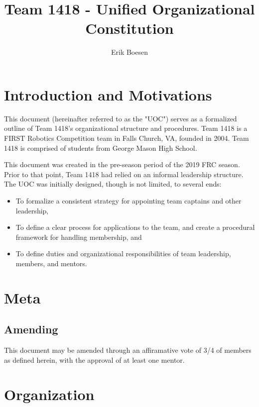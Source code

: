 \documentclass{proc}
\begin{document}
\title{Team 1418 - Unified Organizational Constitution}
\author{Erik Boesen}

\maketitle

\section{Introduction and Motivations}
This document (hereinafter referred to as the "UOC") serves as a formalized outline of Team 1418's organizational structure and procedures. Team 1418 is a FIRST Robotics Competition team in Falls Church, VA, founded in 2004. Team 1418 is comprised of students from George Mason High School.

This document was created in the pre-season period of the 2019 FRC season. Prior to that point, Team 1418 had relied on an informal leadership structure. The UOC was initially designed, though is not limited, to several ends:
\begin{itemize}
  \item{To formalize a consistent strategy for appointing team captains and other leadership,}
  \item{To define a clear process for applications to the team, and create a procedural framework for handling membership, and}
  \item{To define duties and organizational responsibilities of team leadership, members, and mentors.}
\end{itemize}

\section{Meta}
\subsection{Amending}
This document may be amended through an affiramative vote of 3/4 of members as defined herein, with the approval of at least one mentor.

\section{Organization}
\end{document}
